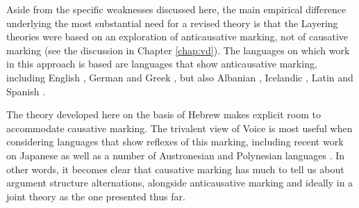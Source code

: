 Aside from the specific weaknesses discussed here, the main empirical difference underlying the most substantial need for a revised theory is that the Layering theories were based on an exploration of anticausative marking, not of causative marking (see the discussion in Chapter \ref{chap:vd}). The languages on which work in this approach is based are languages that show anticausative marking, including English \citep{myler16mit}, German \citep{schaefer17oup} and Greek \citep{spathasetal15}, but also Albanian \citep{kallulli13}, Icelandic \citep{wood15springer}, Latin \citep{embick04,kastnerzu17} and Spanish \citep{schaefervivanco16}.

The theory developed here on the basis of Hebrew makes explicit room to accommodate causative marking. The trivalent view of Voice is most useful when considering languages that show reflexes of this marking, including recent work on Japanese \citep{oseki17nyu} as well as a number of Austronesian and Polynesian languages \citep{nie17}. In other words, it becomes clear that causative marking has much to tell us about argument structure alternations, alongside anticausative marking and ideally in a joint theory as the one presented thus far.

